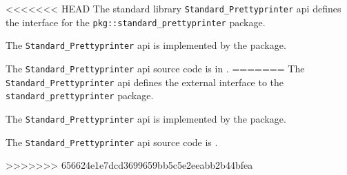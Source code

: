 
<<<<<<< HEAD
The standard library {\tt Standard\_Prettyprinter} api defines the interface for the {\tt pkg::standard\_prettyprinter} package.

The {\tt Standard\_Prettyprinter} api is implemented by the 
 package.

The {\tt Standard\_Prettyprinter} api source code is in .
=======
The {\tt Standard\_Prettyprinter} api defines the external interface to the {\tt standard\_prettyprinter} package.

The {\tt Standard\_Prettyprinter} api is implemented by the  package.

The {\tt Standard\_Prettyprinter} api source code is .


>>>>>>> 656624e1e7dcd3699659bb5c5e2eeabb2b44bfea
